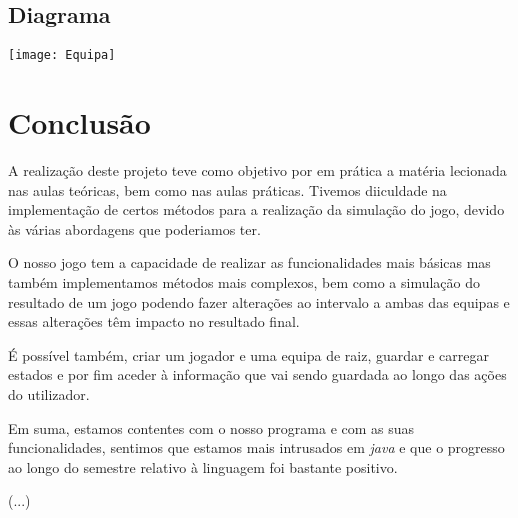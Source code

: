 \documentclass[a4paper,12pt]{article}
\begin{document}
\subsection{Diagrama}
    \begin{center}
        \vspace*{1cm}
        \texttt{[image: Equipa]}
    \end{center}

\newpage

\section{Conclusão}
    A realização deste projeto teve como objetivo por em prática a matéria lecionada nas aulas teóricas, bem como nas
aulas práticas. Tivemos diiculdade na implementação de certos métodos para a realização da simulação do jogo, devido às
várias abordagens que poderiamos ter.\par
    O nosso jogo tem a capacidade de realizar as funcionalidades mais básicas mas também implementamos métodos mais
complexos, bem como a simulação do resultado de um jogo podendo fazer alterações ao intervalo a ambas das equipas
e essas alterações têm impacto no resultado final.\par
    É possível também, criar um jogador e uma equipa de raiz, guardar e carregar estados e por fim aceder à informação
que vai sendo guardada ao longo das ações do utilizador.\par
    Em suma, estamos contentes com o nosso programa e com as suas funcionalidades, sentimos que estamos mais intrusados
em \emph{java} e que o progresso ao longo do semestre relativo à linguagem foi bastante positivo.


(...)
\end{document}
